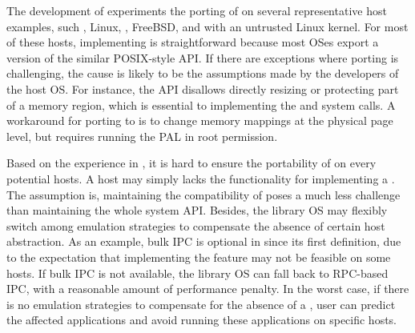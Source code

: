 The development of \graphene{} experiments the porting of \thehostabi{}
on several representative host examples, such \win{}, Linux, \osx{}, FreeBSD, and \sgx{} with an untrusted Linux kernel.
For most of these hosts,
implementing \thehostabi{} is straightforward because most OSes export a version of the similar POSIX-style API.
If there are exceptions where porting \thehostabi{} is challenging,
the cause is likely to be the assumptions made by the developers of the host OS.
For instance, the \win{} API disallows directly resizing or protecting part of a memory region, which is essential to implementing the  and  system calls.
A workaround for porting \thehostabi{} to \win{} is to change memory mappings at the physical page level,
but requires running the PAL in root permission.




Based on the experience in \graphene{},
it is hard to ensure the portability of \thehostabi{} on every potential hosts.
A host may simply lacks the functionality
for implementing a \hostapi{}.
The assumption is, maintaining the compatibility of \thehostabi{} poses a much less challenge than maintaining the whole system API.
Besides, the library OS may flexibly switch among emulation strategies
to compensate the absence of certain host abstraction.
As an example,
bulk IPC is optional in \thehostabi{} since its first definition,
due to the expectation
that implementing the feature may not be feasible on some hosts.
If bulk IPC is not available,
the library OS can fall back to RPC-based IPC, with a reasonable amount of performance penalty.
In the worst case, if there is no emulation strategies
to compensate for the absence of a \hostapi{},
user can predict the affected applications and avoid running these applications
on specific hosts. 



